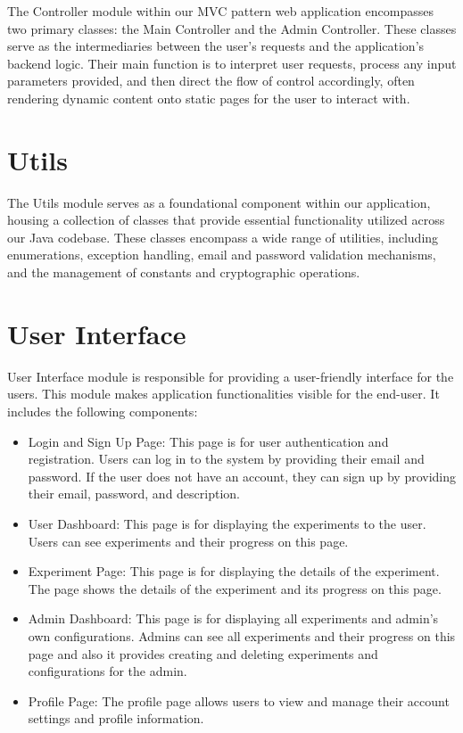 The Controller module within our MVC pattern web application encompasses two primary classes: the Main
Controller and the Admin Controller. These classes serve as the intermediaries between the user's requests 
and the application's backend logic. Their main function is to interpret user requests, process any input 
parameters provided, and then direct the flow of control accordingly, often rendering dynamic content 
onto static pages for the user to interact with.

\section{Utils}

The Utils module serves as a foundational component within our application, housing a collection of 
classes that provide essential functionality utilized across our Java codebase. These classes encompass 
a wide range of utilities, including enumerations, exception handling, email and password validation 
mechanisms, and the management of constants and cryptographic operations.

\section{User Interface}

User Interface module is responsible for providing a user-friendly interface for the users. This module makes application functionalities visible for the end-user. It includes the following components:\\
\begin{itemize}
    \item Login and Sign Up Page: This page is for user authentication and registration. Users can log in to the system by providing their email and password. If the user does not have an account, they can sign up by providing their email, password, and description.
    \item User Dashboard: This page is for displaying the experiments to the user. Users can see experiments and their progress on this page.
    \item Experiment Page: This page is for displaying the details of the experiment. The page shows the details of the experiment and its progress on this page.
    \item Admin Dashboard: This page is for displaying all experiments and admin's own configurations. Admins can see all experiments and their progress on this page and also it provides creating and deleting experiments and configurations for the admin.
    \item Profile Page: The profile page allows users to view and manage their account settings and profile information.
\end{itemize}


